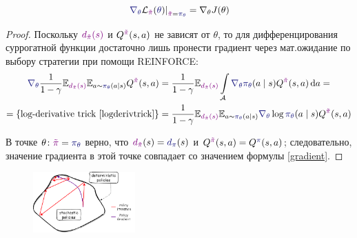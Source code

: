 \begin{proposition}
$$\left. \textcolor{ChadBlue}{\nabla_{\theta}} \mathcal{L}_{\textcolor{ChadPurple}{\tilde{\pi}}}(\textcolor{ChadBlue}{\theta}) \right|_{\textcolor{ChadPurple}{\tilde{\pi}} = \textcolor{ChadBlue}{\pi_{\theta}}} = \nabla_{\theta} J(\theta)$$
\begin{proof}
Поскольку $\textcolor{ChadPurple}{d_{\tilde{\pi}}(s)}$ и $Q^{\textcolor{ChadPurple}{\tilde{\pi}}}(s, a)$ не зависят от $\theta$, то для дифференцирования суррогатной функции достаточно лишь пронести градиент через мат.ожидание по выбору стратегии при помощи REINFORCE:
\begin{align*}
\textcolor{ChadBlue}{\nabla_{\theta}} \frac{1}{1 - \gamma}\E_{\textcolor{ChadPurple}{d_{\tilde{\pi}}(s)}} \E_{a \sim \textcolor{ChadBlue}{\pi_{\theta}}(a \mid s)} Q^{\textcolor{ChadPurple}{\tilde{\pi}}}(s, a) &= 
\frac{1}{1 - \gamma}\E_{\textcolor{ChadPurple}{d_{\tilde{\pi}}(s)}} \int\limits_{\A} \textcolor{ChadBlue}{\nabla_{\theta}} \textcolor{ChadBlue}{\pi_{\theta}}(a \mid s) Q^{\textcolor{ChadPurple}{\tilde{\pi}}}(s, a) \diff a = \\
= \{ \text{log-derivative trick \eqref{logderivtrick}} \}
&= \frac{1}{1 - \gamma}\E_{\textcolor{ChadPurple}{d_{\tilde{\pi}}(s)}} \E_{a \sim \textcolor{ChadBlue}{\pi_{\theta}}(a \mid s)} \textcolor{ChadBlue}{\nabla_{\theta}} \log \textcolor{ChadBlue}{\pi_{\theta}}(a \mid s) Q^{\textcolor{ChadPurple}{\tilde{\pi}}}(s, a)
\end{align*}

В точке $\theta \colon \textcolor{ChadPurple}{\tilde{\pi}} \HM= \textcolor{ChadBlue}{\pi_{\theta}}$ верно, что $\textcolor{ChadPurple}{d_{\tilde{\pi}}}(s) \HM= \textcolor{ChadBlue}{d_{\pi}}(s)$ и $Q^{\textcolor{ChadPurple}{\tilde{\pi}}}(s, a) \HM = Q^{\textcolor{ChadBlue}{\pi}}(s, a)$; следовательно, значение градиента в этой точке совпадает со значением формулы \eqref{gradient}.
\end{proof}
\end{proposition}

\begin{figure}
\centering
\includegraphics[width=0.35\textwidth]{Images/PGisPI.png}
\vspace{-0.5cm}
\end{figure}

